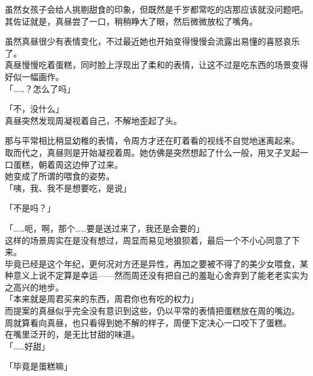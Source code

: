 虽然女孩子会给人挑剔甜食的印象，但既然是千岁都常吃的店那应该就没问题吧。\\

其佐证就是，真昼尝了一口，稍稍睁大了眼，然后微微放松了嘴角。

虽然真昼很少有表情变化，不过最近她也开始变得慢慢会流露出易懂的喜怒哀乐了。\\

真昼慢慢吃着蛋糕，同时脸上浮现出了柔和的表情，让这不过是吃东西的场景变得好似一幅画作。\\

「……？怎么了吗」

「不，没什么」\\

真昼突然发现周凝视着自己，不解地歪起了头。

那与平常相比稍显幼稚的表情，令周方才还在盯着看的视线不自觉地迷离起来。\\

取而代之，真昼则是开始凝视着周。她仿佛是突然想起了什么一般，用叉子叉起一口蛋糕，朝着周这边伸了过来。\\

她变成了所谓的喂食的姿势。\\

「咦，我、我不是想要吃，是说」

「不是吗？」

「……呃，啊，那个……要是送过来了，我还是会要的」\\

这样的场景周实在是没有想过，周显而易见地狼狈着，最后一个不小心同意了下来。\\

毕竟已经是这个年纪，更何况对方还是异性，再加之要被不得了的美少女喂食，某种意义上说不定算是幸运——然而周还没有把自己的羞耻心舍弃到了能老老实实为之高兴的地步。\\

「本来就是周君买来的东西，周君你也有吃的权力」\\

而提案的真昼似乎完全没有意识到这些，仍以平常的表情把蛋糕放在周的嘴边。\\

周就算看向真昼，也只看得到她不解的样子，周便下定决心一口咬下了蛋糕。\\

在嘴里泛开的，是无比甘甜的味道。\\

「……好甜」

「毕竟是蛋糕嘛」\\

